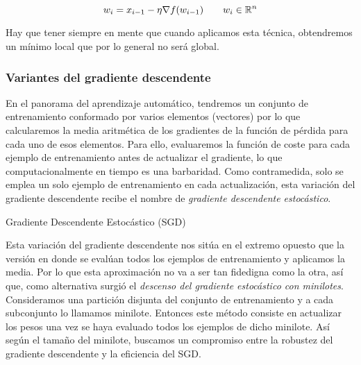     \begin{equation}
        w_i = x_{i-1} - \eta \nabla f(w_{i-1}) \qquad w_i \in \mathbb{R}^n 
    \end{equation}


    Hay que tener siempre en mente que cuando aplicamos esta técnica, obtendremos un mínimo local que por lo general no será global. \\
    
    \subsubsection{Variantes del gradiente descendente}
    
    En el panorama del aprendizaje automático, tendremos un conjunto de entrenamiento conformado por varios elementos (vectores) por lo que calcularemos la media aritmética de los gradientes de la función de pérdida para cada uno de esos elementos. Para ello, evaluaremos la función de coste para cada ejemplo de entrenamiento antes de actualizar el gradiente, lo que computacionalmente en tiempo es una barbaridad. Como contramedida, solo se emplea un solo ejemplo de entrenamiento en cada actualización, esta variación del gradiente descendente recibe el nombre de \textit{gradiente descendente estocástico}. \\
    
    
        \begin{algorithm}[H]
	       \label{alg:SGD}
	        \caption{Gradiente Descendente Estocástico (SGD)}
	        

	           
	   \end{algorithm}
	   
	   
	 Esta variación del gradiente descendente nos sitúa en el extremo opuesto que la versión en donde se evalúan todos los ejemplos de entrenamiento y aplicamos la media. Por lo que esta aproximación no va a ser tan fidedigna como la otra, así que, como alternativa surgió el \textit{descenso del gradiente estocástico con minilotes}. Consideramos una partición disjunta del conjunto de entrenamiento y a cada subconjunto lo llamamos minilote. Entonces este método consiste en actualizar los pesos una vez se haya evaluado todos los ejemplos de dicho minilote. Así según el tamaño del minilote, buscamos un compromiso entre la robustez del gradiente descendente y la eficiencia del SGD. \\
	 
